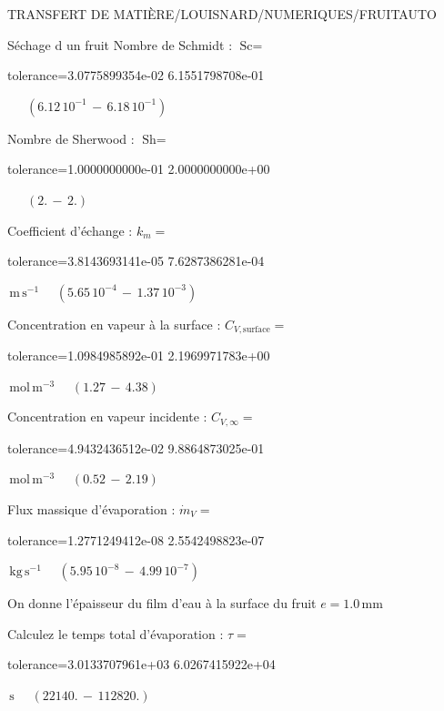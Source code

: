\documentclass[12pt]{article}
\begin{document}
\begin{quiz}{TRANSFERT DE MATIÈRE/LOUISNARD/NUMERIQUES/FRUITAUTO}
\begin{cloze}{Séchage d un fruit}
Nombre de Schmidt : $\text{Sc} =  $
\begin{numerical}[points=1] 
\item[tolerance={3.0775899354e-02}] 6.1551798708e-01 
\end{numerical} 
 $\,$ 
 $ \quad ( 6.12 \, 10^{-1}  \, - \,  6.18 \, 10^{-1} ) $ 

Nombre de Sherwood : $\text{Sh} =  $
\begin{numerical}[points=2] 
\item[tolerance={1.0000000000e-01}] 2.0000000000e+00 
\end{numerical} 
 $\,$ 
 $ \quad (2. \, - \, 2.) $ 

Coefficient d'échange : $k_m =  $
\begin{numerical}[points=1] 
\item[tolerance={3.8143693141e-05}] 7.6287386281e-04 
\end{numerical} 
 $\,  \mathrm{m}\,  \mathrm{s}^{-1}$ 
 $ \quad ( 5.65 \, 10^{-4}  \, - \,  1.37 \, 10^{-3} ) $ 

Concentration en vapeur à la surface : $C_{V, \text{surface}} =  $
\begin{numerical}[points=2] 
\item[tolerance={1.0984985892e-01}] 2.1969971783e+00 
\end{numerical} 
 $\,  \mathrm{mol}\,  \mathrm{m}^{-3}$ 
 $ \quad (1.27 \, - \, 4.38) $ 

Concentration en vapeur incidente : $C_{V, \infty} =  $
\begin{numerical}[points=2] 
\item[tolerance={4.9432436512e-02}] 9.8864873025e-01 
\end{numerical} 
 $\,  \mathrm{mol}\,  \mathrm{m}^{-3}$ 
 $ \quad (0.52 \, - \, 2.19) $ 

Flux massique d'évaporation : $\dot{m}_V =  $
\begin{numerical}[points=1] 
\item[tolerance={1.2771249412e-08}] 2.5542498823e-07 
\end{numerical} 
 $\,  \mathrm{kg}\,  \mathrm{s}^{-1}$ 
 $ \quad ( 5.95 \, 10^{-8}  \, - \,  4.99 \, 10^{-7} ) $ 

 

On donne l'épaisseur du film d'eau à la surface du fruit $e = 1.0\,  \mathrm{mm} $

Calculez le temps total d'évaporation : $\tau =  $
\begin{numerical}[points=2] 
\item[tolerance={3.0133707961e+03}] 6.0267415922e+04 
\end{numerical} 
 $\,  \mathrm{s}$ 
 $ \quad (22140. \, - \, 112820.) $ 


\end{cloze}
\end{quiz}
\end{document}
